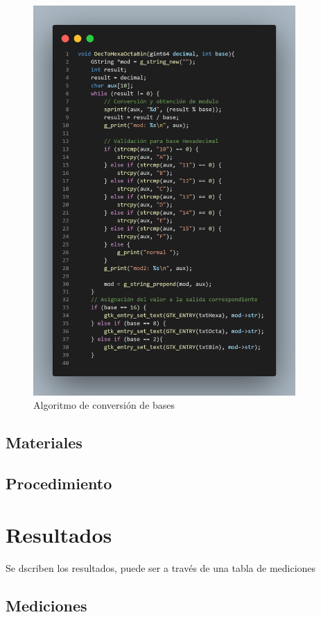 \documentclass[letterpaper,12pt]{extarticle}%
\begin{document}
		\begin{figure}[H]
			\begin{center}
			\includegraphics[width=10cm]{imag//algDecToRest.png}
			\caption{Algoritmo de conversión de bases}
			\label{algDecToRest}
			\end{center}
			\end{figure}
	\subsection{Materiales}	
	
	\subsection{Procedimiento}
	\renewcommand{\labelenumi}{\arabic{enumi}.}
    
    	
    \section{Resultados}
    Se dscriben los resultados, puede ser a través de una tabla de mediciones
	\subsection{Mediciones}
\end{document}
